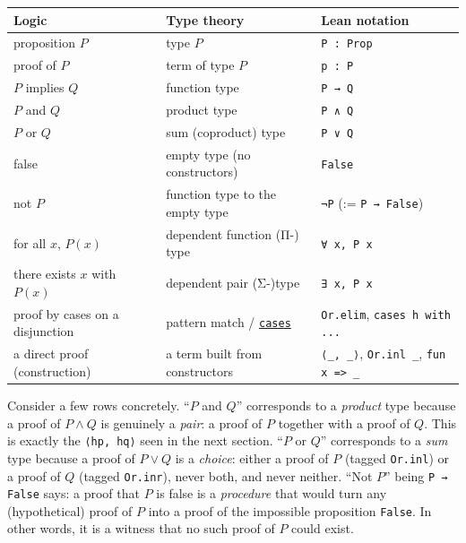 \begin{longtable}[]{@{}
  >{\raggedright\arraybackslash}p{}
  >{\raggedright\arraybackslash}p{}
  >{\raggedright\arraybackslash}p{}@{}}
\toprule\noalign{}
\begin{minipage}[b]{\linewidth}\raggedright
Logic
\end{minipage} & \begin{minipage}[b]{\linewidth}\raggedright
Type theory
\end{minipage} & \begin{minipage}[b]{\linewidth}\raggedright
Lean notation
\end{minipage} \\
\midrule\noalign{}
\endhead
\bottomrule\noalign{}
\endlastfoot
proposition \(P\) & type \(P\) & \texttt{P : Prop} \\
proof of \(P\) & term of type \(P\) & \texttt{p : P} \\
\(P\) implies \(Q\) & function type & \texttt{P → Q} \\
\(P\) and \(Q\) & product type & \texttt{P ∧ Q} \\
\(P\) or \(Q\) & sum (coproduct) type & \texttt{P ∨ Q} \\
false & empty type (no constructors) & \texttt{False} \\
not \(P\) & function type to the empty type & \texttt{¬P} (:= \texttt{P → False}) \\
for all \(x\), \(P(x)\) & dependent function (Π-) type & \texttt{∀ x, P x} \\
there exists \(x\) with \(P(x)\) & dependent pair (Σ-)type & \texttt{∃ x, P x} \\
proof by cases on a disjunction & pattern match / \href{https://lean-lang.org/doc/reference/latest/Tactic-Proofs/Tactic-Reference/}{\texttt{cases}} & \texttt{Or.elim}, \texttt{cases h with ...} \\
a direct proof (construction) & a term built from constructors & \texttt{⟨\_\allowbreak{}, \_\allowbreak{}⟩}, \texttt{Or.inl \_\allowbreak{}}, \texttt{fun x => \_\allowbreak{}} \\
\end{longtable}

Consider a few rows concretely. ``\(P\) and \(Q\)'' corresponds to a \emph{product} type because a proof of \(P \wedge Q\) is genuinely a \emph{pair}: a proof of \(P\) together with a proof of \(Q\). This is exactly the \texttt{⟨hp, hq⟩} seen in the next section. ``\(P\) or \(Q\)'' corresponds to a \emph{sum} type because a proof of \(P \vee Q\) is a \emph{choice}: either a proof of \(P\) (tagged \texttt{Or.inl}) or a proof of \(Q\) (tagged \texttt{Or.inr}), never both, and never neither. ``Not \(P\)'' being \texttt{P → False} says: a proof that \(P\) is false is a \emph{procedure} that would turn any (hypothetical) proof of \(P\) into a proof of the impossible proposition \texttt{False}. In other words, it is a witness that no such proof of \(P\) could exist.

